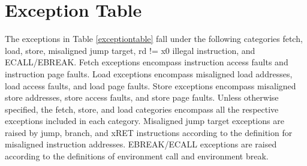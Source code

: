 \documentclass[12pt]{article}
\begin{document}
\section{Exception Table}
The exceptions in Table \ref{exceptiontable} fall under the following categories fetch, load, store, misaligned jump target, rd != x0 illegal instruction, and ECALL/EBREAK. Fetch exceptions encompass instruction access faults and instruction page faults. Load exceptions encompass misaligned load addresses, load access faults, and load page faults. Store exceptions encompass misaligned store addresses, store access faults, and store page faults. Unless otherwise specified, the fetch, store, and load categories encompass all the respective exceptions included in each category. Misaligned jump target exceptions are raised by jump, branch, and xRET instructions according to the definition for misaligned instruction addresses. EBREAK/ECALL exceptions are raised according to the definitions of environment call and environment break.
\end{document}
